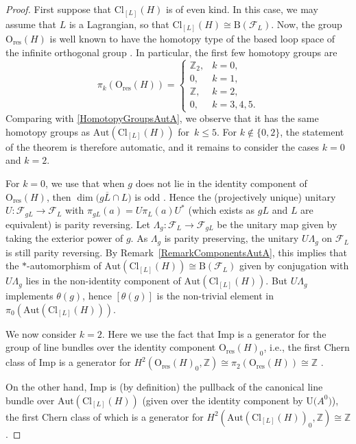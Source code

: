\documentclass[10pt,a4paper]{amsart}
\numberwithin{equation}{section}
\newcommand{\Z}{\mathbb{Z}}
\newcommand{\B}{\mathrm{B}}
\newcommand{\Cl}{\mathrm{Cl}}
\newcommand{\res}{\mathrm{res}}
\newcommand{\Aut}{\mathrm{Aut}}
\newcommand{\Imp}{\mathrm{Imp}}
\newcommand{\U}{\mathrm{U}}
\renewcommand{\O}{\mathrm{O}}
\begin{document}
\begin{proof}
First suppose that $\Cl_{[L]}(H)$ is of even kind.
In this case, we may assume that $L$ is a Lagrangian, so that $\Cl_{[L]}(H) \cong \B(\mathcal{F}_L)$.
Now, the group $\O_{\res}(H)$ is well known to have the homotopy type of the based loop space of the infinite orthogonal group \cite[Proposition~12.4.2]{PressleySegal}.
In particular, the first few homotopy groups are
\begin{equation} \label{FirstHomotopyGroupsOres}
 \pi_k(\O_{\res}(H)) = \begin{cases} \Z_2, & k=0, \\ 0, & k=1, \\ \Z, & k=2, \\ 0, & k=3, 4, 5. \end{cases}
\end{equation}
Comparing with \eqref{HomotopyGroupsAutA}, we observe that it has the same homotopy groups as $\Aut(\Cl_{[L]}(H))$ for~$k \leq 5$.
For $k\notin\{0, 2\}$, the statement of the theorem is therefore automatic, and it remains to consider the cases $k=0$ and $k=2$.

For $k=0$, we use that when $g$ does not lie in the identity component of $\O_{\res}(H)$, then $\dim\big(g \overline{L} \cap L\big)$ is odd \cite[Theorem~3.5.1]{PlymenRobinson}.
Hence the (projectively unique) unitary $U\colon \mathcal{F}_{gL} \to \mathcal{F}_L$ with $\pi_{gL}(a) = U \pi_L(a) U^*$ (which exists as $gL$ and $L$ are equivalent) is parity reversing.
Let $\Lambda_g\colon \mathcal{F}_L \to \mathcal{F}_{gL}$ be the unitary map given by taking the exterior power of $g$.
As $\Lambda_g$ is parity preserving, the unitary $U \Lambda_g$ on $\mathcal{F}_L$ is still parity reversing.
By Remark~\ref{RemarkComponentsAutA}, this implies that the $*$-automorphism of $\Aut(\Cl_{[L]}(H)) \cong \B(\mathcal{F}_L)$ given by conjugation with $U \Lambda_g$ lies in the non-identity component of $\Aut(\Cl_{[L]}(H))$. But $U \Lambda_g$ implements $\theta(g)$, hence $[\theta(g)]$ is the non-trivial element in $\pi_0(\Aut(\Cl_{[L]}(H)))$.

We now consider $k=2$.
Here we use the fact that $\Imp$ is a generator for the group of line bundles over the identity component $\O_{\res}(H)_0$, i.e., the first Chern class of $\Imp$ is a generator for $H^2(\O_{\res}(H)_0, \Z) \cong \pi_2(\O_{\res}(H)) \cong \Z$ \cite[Proposition~1.2]{SperaWurzbacherSpinors}.


On the other hand, $\Imp$ is (by definition) the pullback of the canonical line bundle over $\Aut(\Cl_{[L]}(H))$ \big(given over the identity component by $\U\big(A^0\big)$\big), the first Chern class of which is a generator for $H^2(\Aut(\Cl_{[L]}(H))_0, \Z) \cong \Z$.


\end{proof}
\end{document}
